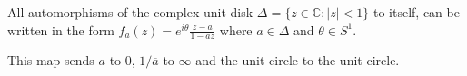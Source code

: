\documentclass[12pt]{article}
\begin{document}
All automorphisms of the complex unit disk 
$\Delta = \{z \in \mathbb{C} : |z| < 1\}$ to itself, 
can be written in the form $f_a(z) = e^{i \theta} \frac{z-a}{1-\overline{a}z}$ where $a \in \Delta$ and $\theta \in S^1$. 

This map sends $a$ to $0$, $1/\overline{a}$ to $\infty$ and the unit circle to the unit circle.
\end{document}
